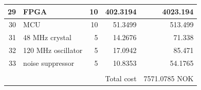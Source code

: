 \documentclass[../main/report.tex]{subfiles}
\begin{document}
\begin{table}[h]
\begin{tabular}{| r | l | r | r | r |}
		29 & FPGA & 10 & 402.3194 & 4023.194 \\\hline
		30 & MCU & 10 & 51.3499 & 513.499 \\\hline
		31 & 48 MHz crystal & 5 & 14.2676 & 71.338 \\\hline
		32 & 120 MHz oscillator & 5 & 17.0942 & 85.471 \\\hline
		33 & noise suppressor & 5 & 10.8353 & 54.1765 \\\hline
		 & & & & \\\hline
		 & & & Total cost & 7571.0785 NOK\\\hline
\end{tabular}
\label{fig: component_order}
\end{table}


%	
%	
\end{document}
